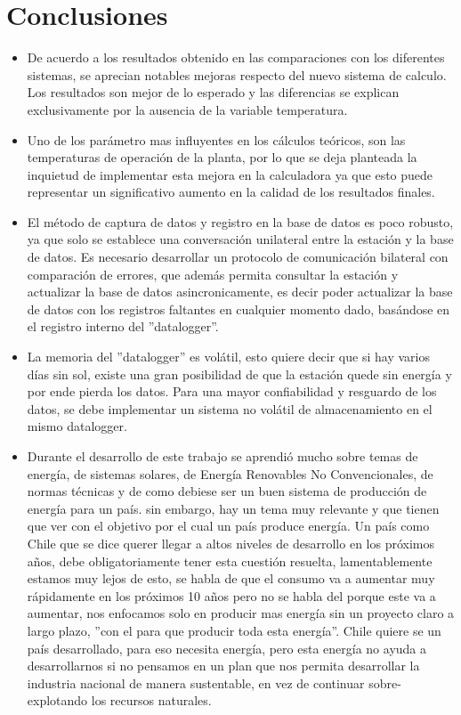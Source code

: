\chapter{Conclusiones}
\label{conclusiones}

\begin{itemize}
\item De acuerdo a los resultados obtenido en las comparaciones con los diferentes sistemas, se aprecian notables mejoras respecto del nuevo sistema de calculo. Los resultados son mejor de lo esperado y las diferencias se explican exclusivamente por la ausencia de la variable temperatura.
\item Uno de los parámetro mas influyentes en los cálculos teóricos, son las temperaturas de operación de la planta, por lo que se deja planteada la inquietud de implementar esta mejora en la calculadora ya que esto puede representar un significativo aumento en la calidad de los resultados finales.
\item El método de captura de datos y registro en la base de datos es poco robusto, ya que solo se establece una conversación unilateral entre la estación y la base de datos. Es necesario desarrollar un protocolo de comunicación bilateral con comparación de errores, que además permita consultar la estación y actualizar la base de datos asincronicamente, es decir poder actualizar la base de datos con los registros faltantes en cualquier momento dado, basándose en el registro interno del ''datalogger''.
\item La memoria del ''datalogger'' es volátil, esto quiere decir que si hay varios días sin sol, existe una gran posibilidad de que la estación quede sin energía y por ende pierda los datos. Para una mayor confiabilidad y resguardo de los datos, se debe implementar un sistema no volátil de almacenamiento en el mismo datalogger.
\item Durante el desarrollo de este trabajo se aprendió mucho sobre temas de energía, de sistemas solares, de Energía Renovables No Convencionales, de normas técnicas y de como debiese ser un buen sistema de producción de energía para un país. sin embargo, hay un tema muy relevante y que tienen que ver con el objetivo por el cual un país produce energía. Un país como Chile que se dice querer llegar a altos niveles de desarrollo en los próximos años, debe obligatoriamente tener esta cuestión resuelta, lamentablemente estamos muy lejos de esto, se habla de que el consumo va a aumentar muy rápidamente en los próximos 10 años pero no se habla del porque este va a aumentar, nos enfocamos solo en producir mas energía sin un proyecto claro a largo plazo, ''con el para que producir toda esta energía''. Chile quiere se un país desarrollado, para eso necesita energía, pero esta energía no ayuda a desarrollarnos si no pensamos en un plan que nos permita desarrollar la industria nacional de manera sustentable, en vez de continuar sobre-explotando los recursos naturales.

\end{itemize}
